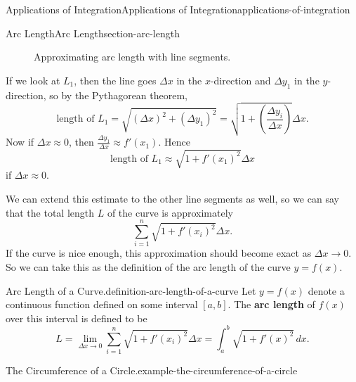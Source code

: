 \documentclass[oneside,10pt,]{book}
\newcommand{\terminology}[1]{\textbf{#1}}
\numberwithin{equation}{section}
\begin{document}
\begin{chapterptx}{Applications of Integration}{}{Applications of Integration}{}{}{applications-of-integration}
\begin{sectionptx}{Arc Length}{}{Arc Length}{}{}{section-arc-length}
\begin{figure}
{
}
\caption{Approximating arc length with line segments.\label{figure-arc-length-breaking-into-line-segments}}
\end{figure}
\hypertarget{p-652}{}%
If we look at \(L_1\), then the line goes \(\Delta x\) in the \(x\)-direction and \(\Delta y_1\) in the \(y\)-direction, so by the Pythagorean theorem,%
\begin{equation*}
\text{length of } L_1 = \sqrt{(\Delta x)^2 + (\Delta y_1)^2} = \sqrt{1 + \left(\frac{\Delta y_{i}}{\Delta x}\right)}\Delta x.
\end{equation*}
Now if \(\Delta x \approx 0\), then \(\frac{\Delta y_{1}}{\Delta x} \approx f'(x_{1})\). Hence%
\begin{equation*}
\text{length of } L_{1} \approx \sqrt{1 + f'(x_{1})^{2}}\Delta x
\end{equation*}
if \(\Delta x\approx 0\).%
\par
\hypertarget{p-653}{}%
We can extend this estimate to the other line segments as well, so we can say that the total length \(L\) of the curve is approximately%
\begin{equation*}
\sum_{i=1}^{n}\sqrt{1 + f'(x_{i})^{2}}\Delta x.
\end{equation*}
If the curve is nice enough, this approximation should become exact as \(\Delta x\to 0\). So we can take this as the definition of the arc length of the curve \(y = f(x)\).%
\begin{definition}{Arc Length of a Curve.}{definition-arc-length-of-a-curve}%
\hypertarget{p-654}{}%
Let \(y = f(x)\) denote a continuous function defined on some interval \([a,b]\). The \terminology{arc length} of \(f(x)\) over this interval is defined to be%
\begin{equation*}
L = \lim_{\Delta x\to0}\sum_{i=1}^{n}\sqrt{1 + f'(x_{i})^{2}}\Delta x = \int_{a}^{b}\sqrt{1 + f'(x)^{2}}\,dx.
\end{equation*}
%
\end{definition}
\begin{example}{The Circumference of a Circle.}{example-the-circumference-of-a-circle}%

\end{example}
\end{sectionptx}
\end{chapterptx}
\end{document}
